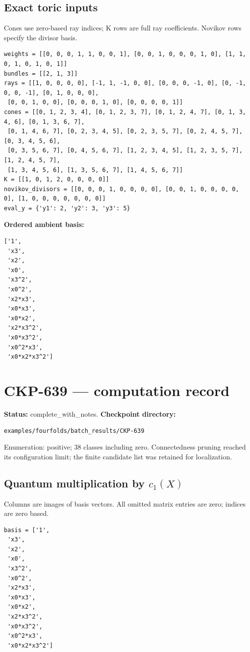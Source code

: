 \documentclass[10pt,a4paper]{article}
\begin{document}
\subsection*{Exact toric inputs}
Cones use zero-based ray indices; K rows are full ray coefficients. Novikov rows specify the divisor basis.

\begin{lstlisting}
weights = [[0, 0, 0, 1, 1, 0, 0, 1], [0, 0, 1, 0, 0, 0, 1, 0], [1, 1, 0, 1, 0, 1, 0, 1]]
bundles = [[2, 1, 3]]
rays = [[1, 0, 0, 0, 0], [-1, 1, -1, 0, 0], [0, 0, 0, -1, 0], [0, -1, 0, 0, -1], [0, 1, 0, 0, 0],
 [0, 0, 1, 0, 0], [0, 0, 0, 1, 0], [0, 0, 0, 0, 1]]
cones = [[0, 1, 2, 3, 4], [0, 1, 2, 3, 7], [0, 1, 2, 4, 7], [0, 1, 3, 4, 6], [0, 1, 3, 6, 7],
 [0, 1, 4, 6, 7], [0, 2, 3, 4, 5], [0, 2, 3, 5, 7], [0, 2, 4, 5, 7], [0, 3, 4, 5, 6],
 [0, 3, 5, 6, 7], [0, 4, 5, 6, 7], [1, 2, 3, 4, 5], [1, 2, 3, 5, 7], [1, 2, 4, 5, 7],
 [1, 3, 4, 5, 6], [1, 3, 5, 6, 7], [1, 4, 5, 6, 7]]
K = [[1, 0, 1, 2, 0, 0, 0, 0]]
novikov_divisors = [[0, 0, 0, 1, 0, 0, 0, 0], [0, 0, 1, 0, 0, 0, 0, 0], [1, 0, 0, 0, 0, 0, 0, 0]]
eval_y = {'y1': 2, 'y2': 3, 'y3': 5}
\end{lstlisting}

\textbf{Ordered ambient basis:}
\begin{lstlisting}
['1',
 'x3',
 'x2',
 'x0',
 'x3^2',
 'x0^2',
 'x2*x3',
 'x0*x3',
 'x0*x2',
 'x2*x3^2',
 'x0*x3^2',
 'x0^2*x3',
 'x0*x2*x3^2']
\end{lstlisting}

\clearpage\section*{CKP-639 --- computation record}
\textbf{Status:} complete\_with\_notes.
\textbf{Checkpoint directory:}
\begin{lstlisting}
examples/fourfolds/batch_results/CKP-639
\end{lstlisting}

Enumeration: positive; 38 classes including zero.
Connectedness pruning reached its configuration limit; the finite candidate list was retained for localization.
\subsection*{Quantum multiplication by $c_1(X)$}
Columns are images of basis vectors. All omitted matrix entries are zero; indices are zero based.

\begin{lstlisting}
basis = ['1',
 'x3',
 'x2',
 'x0',
 'x3^2',
 'x0^2',
 'x2*x3',
 'x0*x3',
 'x0*x2',
 'x2*x3^2',
 'x0*x3^2',
 'x0^2*x3',
 'x0*x2*x3^2']
\end{lstlisting}
\end{document}
